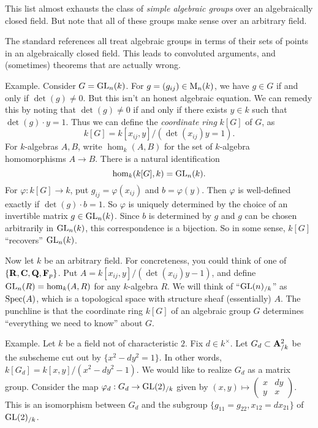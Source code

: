 This list almost exhausts the class of \emph{simple algebraic groups} over an 
algebraically closed field. But note that all of these groups make sense over 
an arbitrary field. 

The standard references \cite{borel-1991,humphreys-1975,springer-2009} all treat 
algebraic groups in terms of their sets of points in an algebraically closed 
field. This leads to convoluted arguments, and (sometimes) theorems that are 
actually wrong. 

Example. Consider $G=\operatorname{GL}_n(k)$. For $g=(g_{i j})\in \operatorname{M}_n(k)$, we have 
$g\in G$ if and only if $\det(g)\ne 0$. But this isn't an honest algebraic 
equation. We can remedy this by noting that $\det(g)\ne 0$ if and only if 
there exists $y\in k$ such that $\det(g)\cdot y=1$. Thus we can define the 
\emph{coordinate ring} $k[G]$ of $G$, as 
\[
  k[G] = k[x_{i j},y] / (\det(x_{i j})y=1) .
\]
For $k$-algebras $A,B$, write $\hom_k(A,B)$ for the set of $k$-algebra 
homomorphisms $A\to B$. There is a natural identification 
\[
  \hom_k(k[G],k) = \operatorname{GL}_n(k) .
\]
For $\varphi:k[G]\to k$, put $g_{i j} = \varphi(x_{i j})$ and 
$b=\varphi(y)$. Then $\varphi$ is well-defined exactly if 
$\det(g)\cdot b=1$. So $\varphi$ is uniquely determined by the choice of an 
invertible matrix $g\in \operatorname{GL}_n(k)$. Since $b$ is determined by $g$ and $g$ can 
be chosen arbitrarily in $\operatorname{GL}_n(k)$, this correspondence is a bijection. So in 
some sense, $k[G]$ ``recovers'' $\operatorname{GL}_n(k)$. 

Now let $k$ be an arbitrary field. For concreteness, you could think of one of 
$\{\mathbf{R},\mathbf{C},\mathbf{Q},\mathbf{F}_p\}$. Put $A=k[x_{i j},y]/(\det(x_{i j}) y-1)$, and define 
$\operatorname{GL}_n(R)=\hom_k(A,R)$ for any $k$-algebra $R$. We will think of 
``$\operatorname{GL}(n)_{/k}$'' as $\operatorname{Spec}(A)$, which is a topological space with structure 
sheaf (essentially) $A$. The punchline is that the coordinate ring 
$k[G]$ of an algebraic group $G$ determines ``everything we need to know'' about 
$G$. 

Example. Let $k$ be a field not of characteristic $2$. Fix $d\in k^\times$. 
Let $G_d\subset \mathbf{A}_{/k}^2$ be the subscheme cut out by $\{x^2-d y^2=1\}$. In 
other words, $k[G_d]=k[x,y]/(x^2-d y^2-1)$. We 
would like to realize $G_d$ as a matrix group. Consider the map 
$\varphi_d:G_d\to \operatorname{GL}(2)_{/k}$ given by $(x,y)\mapsto \begin{pmatrix} x & d y \\ y & x\end{pmatrix}$. 
This is an isomorphism between $G_d$ and the subgroup 
$\{g_{11}=g_{22},x_{12}=d x_{21}\}$ of $\operatorname{GL}(2)_{/k}$. 

